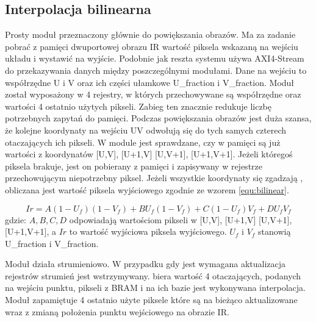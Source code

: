 


\subsection{Interpolacja bilinearna} %

Prosty moduł przeznaczony głównie do powiększania obrazów. %
Ma za zadanie pobrać z pamięci dwuportowej obrazu IR wartość piksela wskazaną na wejściu układu i wystawić na wyjście. %
Podobnie jak reszta systemu używa AXI4-Stream do przekazywania danych między poszczególnymi modułami. 
Dane na wejściu to współrzędne U i V oraz ich części ułamkowe U\_fraction i V\_fraction. 
Moduł został wyposażony w 4 rejestry, w których przechowywane są współrzędne oraz wartości 4 ostatnio użytych pikseli. 
Zabieg ten znacznie redukuje liczbę potrzebnych zapytań do pamięci. 
Podczas powiększania obrazów jest duża szansa, że kolejne koordynaty na wejściu UV odwołują się do tych samych czterech otaczających ich pikseli. 
W module jest sprawdzane, czy w pamięci są już wartości z koordynatów [U,V], [U+1,V] [U,V+1], [U+1,V+1]. 
Jeżeli któregoś piksela brakuje, jest on pobierany z pamięci i zapisywany w rejestrze przechowującym niepotrzebny piksel. 
Jeżeli wszystkie koordynaty się zgadzają , obliczana jest wartość piksela wyjściowego zgodnie ze wzorem \eqref{equ:bilinear}.  

\begin{equation}\label{equ:bilinear}
Ir = A(1-U_f)(1-V_f)+BU_f(1-V_f)+C(1-U_f)V_f+ D U_fV_f
\end{equation}
\noindent gdzie: $ A, B, C ,D $ odpowiadają wartościom pikseli w [U,V], [U+1,V] [U,V+1], [U+1,V+1], a $ Ir $ to wartość wyjściowa piksela wyjściowego. $U_f$ i $V_f$ stanowią U\_fraction i V\_fraction. %

Moduł działa strumieniowo. 
W przypadku gdy jest wymagana aktualizacja rejestrów strumień jest wstrzymywany.
biera wartość 4 otaczających, podanych na wejściu punktu, pikseli z BRAM i na ich bazie jest wykonywana interpolacja. %
Moduł zapamiętuje 4 ostatnio użyte piksele które są na bieżąco aktualizowane wraz z zmianą położenia punktu wejściowego na obrazie IR.


